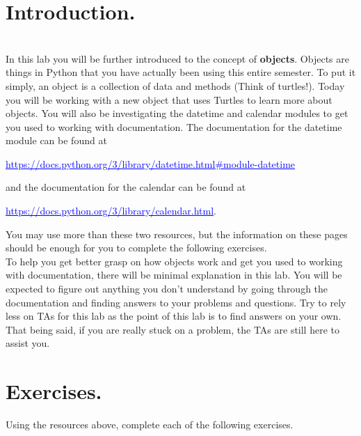 \documentclass[11pt, letterpaper, onecolumn, oneside, final]{article}
\begin{document}
\maketitle

\section{Introduction.} \\
In this lab you will be further introduced to the concept of \textbf{objects}. Objects are things in Python that  you have actually been using this entire semester. To put it simply, an object is a collection of data and methods (Think of turtles!). Today you will be working with a new object that uses Turtles to learn more about objects. You will also be investigating the {\consolas datetime} and {\consolas calendar} modules to get you used to working with documentation. The documentation for the {\consolas datetime} module can be found at 
\begin{center}
    \newline\textcolor{blue}{\underline{https://docs.python.org/3/library/datetime.html\#module-datetime}}
\end{center}
and the documentation for the {\consolas calendar} can be found at
\begin{center}
    
\newline\textcolor{blue}{\underline{https://docs.python.org/3/library/calendar.html}}.
\end{center} You may use more than these two resources, but the information on these pages should be enough for you to complete the following exercises.\\
To help you get better grasp on how objects work and get you used to working with documentation, there will be minimal explanation in this lab. You will be expected to figure out anything you don't understand by going through the documentation and finding answers to your problems and questions. Try to rely less on TAs for this lab as the point of this lab is to find answers on your own. That being said, if you are really stuck on a problem, the TAs are still here to assist you.

\section{Exercises.} Using the resources above, complete each of the following exercises.
\end{document}
